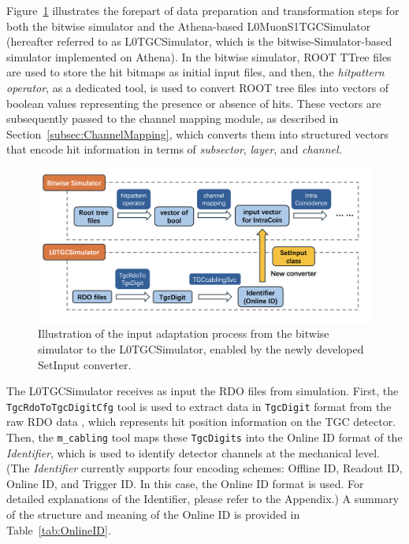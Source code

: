 Figure~\ref{fig:input_adaptation} illustrates the forepart of data preparation and transformation steps for both the bitwise simulator and the Athena-based L0MuonS1TGCSimulator (hereafter referred to as L0TGCSimulator, which is the bitwise-Simulator-based simulator implemented on Athena). In the bitwise simulator, ROOT TTree files are used to store the hit bitmaps as initial input files, and then, the \textit{hitpattern operator}, as a dedicated tool, is used to convert ROOT tree files into vectors of boolean values representing the presence or absence of hits. These vectors are subsequently passed to the channel mapping module, as described in Section~\ref{subsec:ChannelMapping}, which converts them into structured vectors that encode hit information in terms of \textit{subsector}, \textit{layer}, and \textit{channel}.

\begin{figure}[htbp]
  \centering
  \includegraphics[width=1.0\textwidth]{figs/chapter5/input_adaptation.png}
  \caption{Illustration of the input adaptation process from the bitwise simulator to the L0TGCSimulator, enabled by the newly developed SetInput converter.}
  \label{fig:input_adaptation}
\end{figure}

The L0TGCSimulator receives as input the RDO files from simulation. First, the \\\texttt{TgcRdoToTgcDigitCfg} tool is used to extract data in \texttt{TgcDigit} format from the raw RDO data , which represents hit position information on the TGC detector. Then, the \texttt{m\_cabling} tool maps these \texttt{TgcDigits} into the Online ID format of the \textit{Identifier}, which is used to identify detector channels at the mechanical level. (The \textit{Identifier} currently supports four encoding schemes: Offline ID, Readout ID, Online ID, and Trigger ID. In this case, the Online ID format is used. For detailed explanations of the Identifier, please refer to the Appendix.) A summary of the structure and meaning of the Online ID is provided in Table~\ref{tab:OnlineID}.


